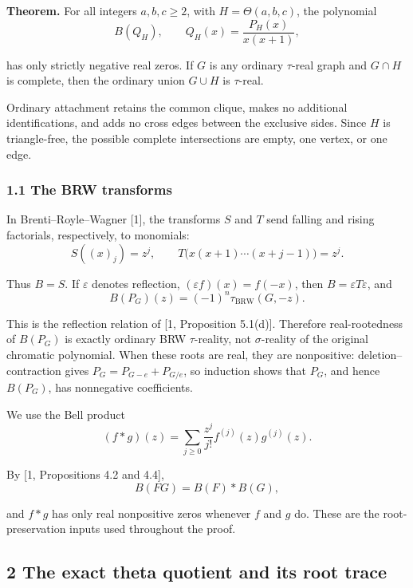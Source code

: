 \documentclass[
  11pt,
  a4paper,
]{article}
\begin{document}
\textbf{Theorem.} For all integers \(a,b,c\geq2\), with
\(H=\Theta(a,b,c)\), the polynomial
\nopagebreak
\[
B(Q_H),\qquad Q_H(x)=\frac{P_H(x)}{x(x+1)},
\]

has only strictly negative real zeros. If \(G\) is any ordinary
\(\tau\)-real graph and \(G\cap H\) is complete, then the ordinary union
\(G\cup H\) is \(\tau\)-real.

Ordinary attachment retains the common clique, makes no additional
identifications, and adds no cross edges between the exclusive sides.
Since \(H\) is triangle-free, the possible complete intersections are
empty, one vertex, or one edge.

\subsubsection{1.1 The BRW transforms}\label{the-brw-transforms}

In Brenti--Royle--Wagner {[}1{]}, the transforms \(S\) and \(T\) send
falling and rising factorials, respectively, to monomials:
\nopagebreak
\[
S((x)_j)=z^j,\qquad
T\bigl(x(x+1)\cdots(x+j-1)\bigr)=z^j.
\]

Thus \(B=S\). If \(\varepsilon\) denotes reflection,
\((\varepsilon f)(x)=f(-x)\), then \(B=\varepsilon T\varepsilon\), and
\nopagebreak
\[
B(P_G)(z)=(-1)^n\tau_{\mathrm{BRW}}(G,-z).\tag{1}
\]

This is the reflection relation of {[}1, Proposition 5.1(d){]}.
Therefore real-rootedness of \(B(P_G)\) is exactly ordinary BRW
\(\tau\)-reality, not \(\sigma\)-reality of the original chromatic
polynomial. When these roots are real, they are nonpositive:
deletion--contraction gives \(P_G=P_{G-e}+P_{G/e}\), so induction shows
that \(P_G\), and hence \(B(P_G)\), has nonnegative coefficients.

We use the Bell product
\nopagebreak
\[
(f*g)(z)=\sum_{j\geq0}\frac{z^j}{j!}f^{(j)}(z)g^{(j)}(z).
\]

By {[}1, Propositions 4.2 and 4.4{]},
\nopagebreak
\[
B(FG)=B(F)*B(G),\tag{2}
\]

and \(f*g\) has only real nonpositive zeros whenever \(f\) and \(g\) do.
These are the root-preservation inputs used throughout the proof.

\subsection{2 The exact theta quotient and its root
trace}\label{the-exact-theta-quotient-and-its-root-trace}
\end{document}
